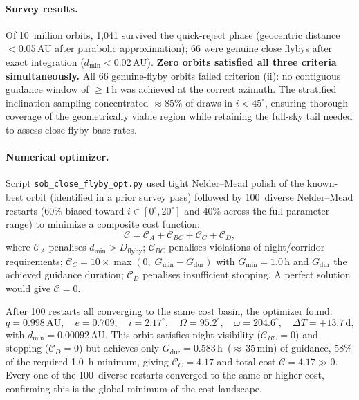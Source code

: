 \documentclass[11pt,a4paper]{article}
\begin{document}
\paragraph{Survey results.}
Of 10~million orbits, 1{,}041 survived the quick-reject phase (geocentric
distance $< 0.05$\,AU after parabolic approximation); 66 were genuine close
flybys after exact integration ($d_\mathrm{min} < 0.02$\,AU).
\textbf{Zero orbits satisfied all three criteria simultaneously.}
All 66 genuine-flyby orbits failed criterion (ii): no contiguous guidance
window of $\geq 1$\,h was achieved at the correct azimuth. The stratified
inclination sampling concentrated $\approx\!85\%$ of draws in $i < 45^\circ$,
ensuring thorough coverage of the geometrically viable region while retaining
the full-sky tail needed to assess close-flyby base rates.

\paragraph{Numerical optimizer.}
Script \texttt{sob\_close\_flyby\_opt.py} used tight Nelder--Mead polish of
the known-best orbit (identified in a prior survey pass) followed by
100~diverse Nelder--Mead restarts (60\% biased toward $i\!\in\![0^\circ,20^\circ]$
and 40\% across the full parameter range) to minimize a composite cost function:
\begin{equation}
  \mathcal{C} = \mathcal{C}_A + \mathcal{C}_{BC} + \mathcal{C}_C + \mathcal{C}_D,
\end{equation}
where $\mathcal{C}_A$ penalises $d_\mathrm{min} > D_\mathrm{flyby}$;
$\mathcal{C}_{BC}$ penalises violations of night/corridor requirements;
$\mathcal{C}_C = 10 \times \max(0,\; G_\mathrm{min} - G_\mathrm{dur})$
with $G_\mathrm{min} = 1.0$\,h and $G_\mathrm{dur}$ the achieved guidance
duration; $\mathcal{C}_D$ penalises insufficient stopping. A perfect solution
would give $\mathcal{C} = 0$.

After 100 restarts all converging to the same cost basin, the optimizer found:
\begin{equation*}
  q = 0.998\,\mathrm{AU},\quad e = 0.709,\quad i = 2.17^\circ,\quad
  \Omega = 95.2^\circ,\quad \omega = 204.6^\circ,\quad \Delta T = +13.7\,\mathrm{d},
\end{equation*}
with $d_\mathrm{min} = 0.00092$\,AU. This orbit satisfies night visibility
($\mathcal{C}_{BC} = 0$) and stopping ($\mathcal{C}_D = 0$) but achieves only
$G_\mathrm{dur} = 0.583$\,h~(${\approx}\,35$\,min) of guidance, 58\% of the
required 1.0~h minimum, giving $\mathcal{C}_C = 4.17$ and total cost
$\mathcal{C} = 4.17 \gg 0$. Every one of the 100~diverse restarts converged
to the same or higher cost, confirming this is the global minimum of the
cost landscape.
\end{document}
